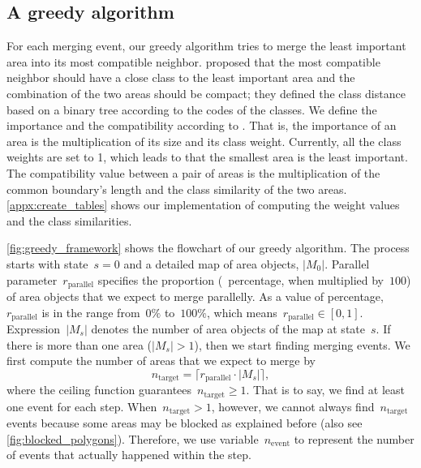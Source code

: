 \documentclass[]{interact}
\begin{document}
\subsection{A greedy algorithm}
\label{sec:greedy_algo}

For each merging event, our greedy algorithm tries to 
merge the least important area into its most compatible neighbor.
\citet{Peng2020AreaAgg} proposed that 
the most compatible neighbor should have a close class
to the least important area
and the combination of the two areas should be compact;
they defined the class distance based on a binary tree
according to the codes of the classes.
We define the importance and the compatibility according to
\citet{vanPutten1998NewGAP}.
That is, the importance of an area is the multiplication 
of its size and its class weight.
Currently, all the class weights are set to 1,
which leads to that the smallest area is the least important.
The compatibility value between a pair of areas is 
the multiplication of the common boundary's length and 
the class similarity of the two areas.
\appx\ref{appx:create_tables} shows our implementation of
computing the weight values and the class similarities.



\fig\ref{fig:greedy_framework} shows the flowchart of our greedy algorithm.
The process starts with state~$s=0$ and a detailed map of area objects, $|M_0|$.
Parallel parameter~$r_\mathrm{parallel}$ specifies 
the proportion (\ie~percentage, when multiplied by~$100$) of area objects that
we expect to merge parallelly.
As a value of percentage, 
$r_\mathrm{parallel}$ is in the range from~$0\%$ to~$100\%$,
which means~$r_\mathrm{parallel} \in [0,1]$.
Expression~$|M_s|$ denotes the number of area objects of the map at state~$s$.
If there is more than one area ($|M_s|>1$),
then we start finding merging events.
We first compute the number of areas that we expect to merge by
\begin{equation}
\label{eq:n_target}
n_\mathrm{target} =
\lceil r_\mathrm{parallel} \cdot |M_s| \rceil,
\end{equation}
where the ceiling function guarantees~$n_\mathrm{target}\ge 1$.
That is to say, we find at least one event for each step.
When~$n_\mathrm{target} > 1$, however,
we cannot always find~$n_\mathrm{target}$ events
because some areas may be blocked as explained before
(also see \fig\ref{fig:blocked_polygons}).
Therefore, we use variable~$n_\mathrm{event}$
to represent the number of events that actually happened within the step. 
\end{document}
